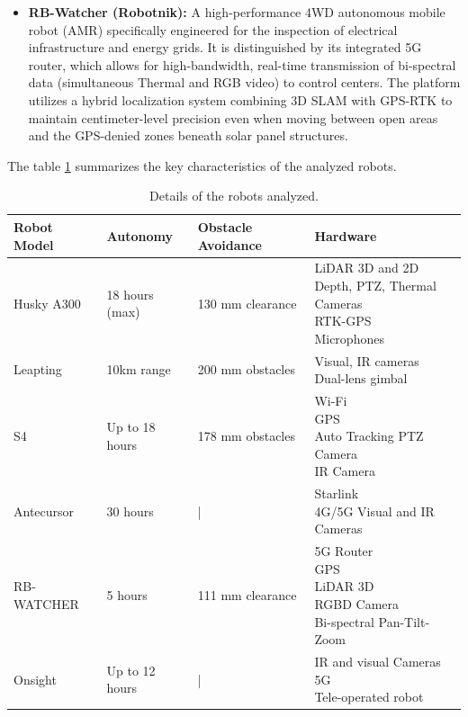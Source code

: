 \begin{itemize}
    \item \textbf{RB-Watcher (Robotnik):} A high-performance 4WD autonomous mobile robot (AMR) specifically engineered for the inspection of electrical infrastructure and energy grids. 
    It is distinguished by its integrated 5G router, which allows for high-bandwidth, real-time transmission of bi-spectral data (simultaneous Thermal and RGB video) to control centers. 
    The platform utilizes a hybrid localization system combining 3D SLAM with GPS-RTK to maintain centimeter-level precision even when moving between open areas and the GPS-denied zones beneath solar panel structures.
\end{itemize}

The table \ref{tab:robot_comparison} summarizes the key characteristics of the analyzed robots.

\begin{table}[!ht]
\begin{center}
    \caption{Details of the robots analyzed.}
    \begin{tabular}{ | p{2.2cm} | p{2cm} | p{1.8cm} | p{5.3cm} | } \hline
        Robot Model & Autonomy & Obstacle Avoidance & Hardware \\\hline\hline
        Husky A300 & 18 hours (max) & 130 mm clearance & 
        \makecell[l]{LiDAR 3D and 2D \\ Depth, PTZ, Thermal Cameras\\ RTK-GPS \\ Microphones} \\\hline
        Leapting & 10km range & 200 mm obstacles &
        \makecell[l]{Visual, IR cameras \\ Dual-lens gimbal} \\\hline
        S4 & Up to 18 hours & 178 mm obstacles &
        \makecell[l]{Wi-Fi \\ GPS \\ Auto Tracking PTZ Camera \\ IR Camera} \\\hline
        Antecursor & 30 hours & | & 
        \makecell[l]{Starlink \\ 4G/5G Visual and IR Cameras} \\\hline
        RB-WATCHER & 5 hours & 111 mm clearance &
        \makecell[l]{5G Router \\ GPS \\ LiDAR 3D \\ RGBD Camera \\ Bi-spectral Pan-Tilt-Zoom} \\\hline
        Onsight & Up to 12 hours & | &
        \makecell[l]{IR and visual Cameras \\ 5G \\ Tele-operated robot} \\\hline
    \end{tabular}
    \label{tab:robot_comparison}
\end{center}
\end{table}

